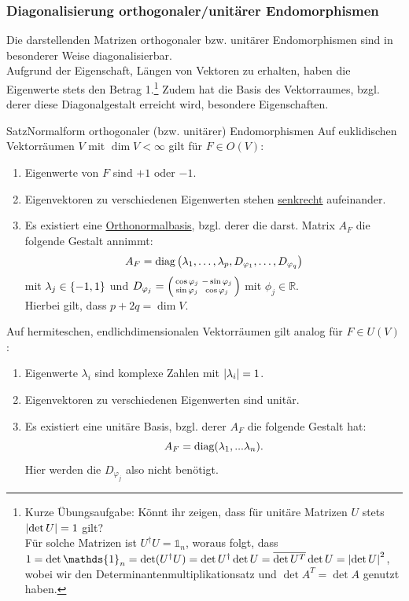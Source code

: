 \subsubsection{Diagonalisierung orthogonaler/unitärer Endomorphismen}
Die darstellenden Matrizen orthogonaler bzw. unitärer Endomorphismen sind in besonderer Weise diagonalisierbar.\\
Aufgrund der Eigenschaft, Längen von Vektoren zu erhalten, haben die Eigenwerte stets den Betrag 1.\footnote{Kurze Übungsaufgabe: Könnt ihr zeigen, dass für unitäre Matrizen $U$ stets $\left|{\det U}\right|=1$ gilt?\\
Für solche Matrizen ist $U^\dag U=\mathds{1}_n$, woraus folgt, dass $1=\det\mathds{1}_n=\det(U^\dag U)=\det U^\dag \det U=\overline{\det U^T}\det U=\Abs{\det U}^2$, wobei wir den Determinantenmultiplikationsatz und $\det A^T=\det A$ genutzt haben.
}
Zudem hat die Basis des Vektorraumes, bzgl. derer diese Diagonalgestalt erreicht wird, besondere Eigenschaften.
\begin{Satz}
{Satz}{Normalform orthogonaler (bzw. unitärer) Endomorphismen}
Auf euklidischen Vektorräumen $V$ mit $\dim V<\infty$ gilt für $F\in O(V)$:
\begin{enumerate}
    \item Eigenwerte von $F$ sind $+1$ oder $-1$.
    \item Eigenvektoren zu verschiedenen Eigenwerten stehen \underline{senkrecht} aufeinander.
    \item Es existiert eine \underline{Orthonormalbasis}, bzgl. derer die darst. Matrix $A_F$ die folgende Gestalt annimmt:
    \begin{equation}
        A_F=\text{diag}\left({\lambda_1,\ldots,\lambda_p,D_{\varphi_1},\ldots,D_{\varphi_q}}\right)
    \end{equation}
    mit $\lambda_j\in\left\{-1,1\right\}$ und $D_{\varphi_j}=\left(\begin{smallmatrix}\cos\varphi_j&-\sin\varphi_j\\\sin\varphi_j&\cos\varphi_j\end{smallmatrix}\right)$ mit $\phi_j\in\mathbb{R}$.\\
    Hierbei gilt, dass $p+2q=\dim V$.
\end{enumerate}
Auf hermiteschen, endlichdimensionalen Vektorräumen gilt analog für $F\in U(V)$:
\begin{enumerate}
    \item Eigenwerte $\lambda_i$ sind komplexe Zahlen mit $\left|{\lambda_i}\right|=1$.
    \item Eigenvektoren zu verschiedenen Eigenwerten sind unitär.
    \item Es existiert eine unitäre Basis, bzgl. derer $A_F$ die folgende Gestalt hat:
    \begin{equation}
        A_F=\text{diag}(\lambda_1,...\lambda_n).
    \end{equation}
    Hier werden die $D_{\varphi_j}$ also nicht benötigt.
\end{enumerate}
\end{Satz}

